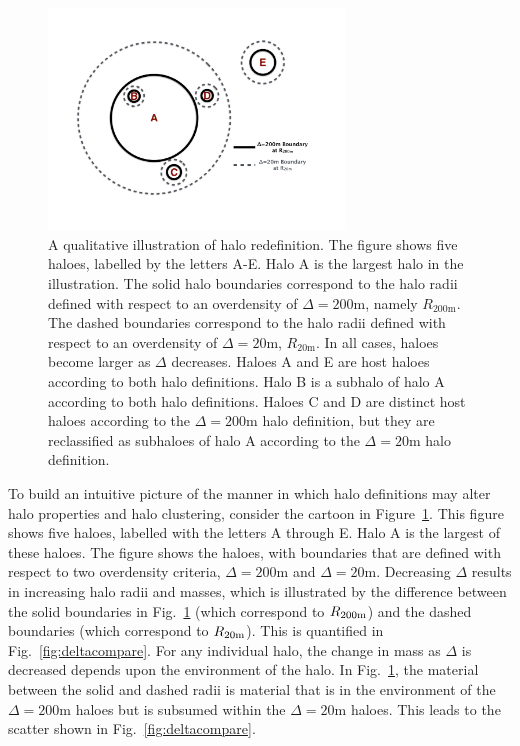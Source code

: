 \documentclass[usenatbib,fleqn]{mnras}
\begin{document}
\begin{figure}
\centering
\includegraphics[width=0.7\textwidth]{cartoon_halos.pdf}
\caption{
A qualitative illustration of halo redefinition. The figure shows five haloes, labelled by the letters A-E. Halo A is the largest halo in the illustration. The solid halo boundaries correspond to the halo radii defined with respect to an overdensity of $\Delta=200$m, namely $R_{200\text{m}}$. The dashed boundaries correspond to the halo radii defined with respect to an overdensity of $\Delta=20$m, $R_{20\text{m}}$. In all cases, haloes become larger as $\Delta$ decreases. Haloes A and E are host haloes according to both halo definitions. Halo B is a subhalo of halo A according to both halo definitions. Haloes C and D are distinct host haloes according to the $\Delta=200$m halo definition, but they are reclassified as subhaloes of halo A according to the $\Delta=20$m halo definition.
}
\label{fig:halocartoon}
\end{figure}

To build an intuitive picture of the manner in which halo definitions may alter halo properties and halo clustering, consider the cartoon in Figure~\ref{fig:halocartoon}. This figure shows five haloes, labelled with the letters A through E. Halo A is the largest of these haloes. The figure shows the haloes, with boundaries that are defined with respect to two overdensity criteria, $\Delta=200$m and $\Delta=20$m. Decreasing $\Delta$ results in increasing halo radii and masses, which is illustrated by the difference between the solid boundaries in Fig.~\ref{fig:halocartoon} (which correspond to $R_{200{\rm m}}$) and the dashed boundaries (which correspond to $R_{20{\rm m}}$). This is quantified in Fig.~\ref{fig:deltacompare}. For any individual halo, the change in mass as $\Delta$ is decreased depends upon the environment of the halo. In Fig.~\ref{fig:halocartoon}, the material between the solid and dashed radii is material that is in the environment of the $\Delta=200$m haloes but is subsumed within the $\Delta=20$m haloes. This leads to the scatter shown in Fig.~\ref{fig:deltacompare}. 
\end{document}
